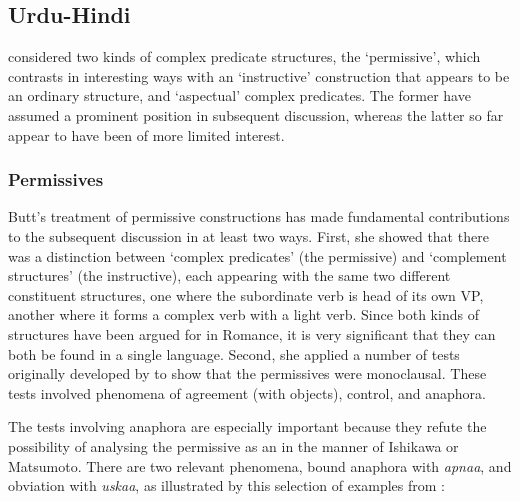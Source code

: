 \documentclass[output=paper,hidelinks]{langscibook}
\begin{document}
\subsection{Urdu-Hindi}
\citet{Butt1993,Butt1995,Butt1997} considered
two kinds of complex predicate structures, the `permissive', which contrasts in
interesting ways with an `instructive' construction that appears to be an ordinary
{\XCOMP} structure, and `aspectual' complex predicates.  The former have assumed
a prominent position in subsequent discussion, whereas the latter so far appear to
have been of more limited interest.

\subsubsection{Permissives}
\largerpage
Butt's treatment of permissive constructions has made fundamental contributions to the
subsequent discussion in at least two ways.  First, she showed that there was a distinction
between `complex predicates' (the permissive) and `complement structures' (the
instructive), each appearing with the same two different constituent structures, one where the subordinate
verb is head of its own VP, another where it forms a complex verb with a light verb.
Since both kinds of structures have been argued for in Romance, it is very significant
that they can both be found in a single language.  Second, she applied a number
of tests originally developed by \citet{MohananT1994} to show that the permissives
were monoclausal.  These tests involved phenomena of agreement (with objects),
control, and anaphora.

\largerpage
The tests involving anaphora are especially important because they refute
the possibility of analysing the permissive as an {\XCOMP} in the manner
of Ishikawa or Matsumoto.  There are two relevant phenomena, bound anaphora
with \emph{apnaa}, and obviation with \emph{uskaa}, as illustrated by this selection
of examples from \citet{AndrewsManning1999}:
\end{document}
